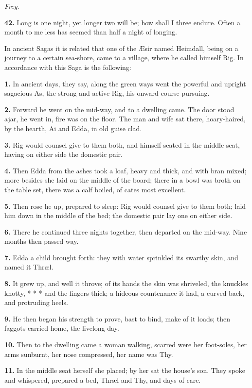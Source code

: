 \emph{Frey}.

\textbf{42.} Long is one night, yet longer two will be; how shall I three
endure. Often a month to me less has seemed than half a night of
longing.


In ancient Sagas it is related that one of the Æsir named Heimdall,
being on a journey to a certain sea-shore, came to a village, where he
called himself Rig. In accordance with this Saga is the following:

\textbf{1.} In ancient days, they say, along the green ways went the powerful
and upright sagacious As, the strong and active Rig, his onward course
pursuing.

\textbf{2.} Forward he went on the mid-way, and to a dwelling came. The door
stood ajar, he went in, fire was on the floor. The man and wife sat
there, hoary-haired, by the hearth, Ai and Edda, in old guise clad.

\textbf{3.} Rig would counsel give to them both, and himself seated in the
middle seat, having on either side the domestic pair.

\textbf{4.} Then Edda from the ashes took a loaf, heavy and thick, and with
bran mixed; more besides she laid on the middle of the board; there in
a bowl was broth on the table set, there was a calf boiled, of cates
most excellent.

\textbf{5.} Then rose he up, prepared to sleep: Rig would counsel give to
them both; laid him down in the middle of the bed; the domestic pair
lay one on either side.

\textbf{6.} There he continued three nights together, then departed on the
mid-way. Nine months then passed way.

\textbf{7.} Edda a child brought forth: they with water sprinkled its swarthy
skin, and named it Thræl.

\textbf{8.} It grew up, and well it throve; of its hands the skin was
shriveled, the knuckles knotty, * * * and the fingers thick; a hideous
countenance it had, a curved back, and protruding heels.

\textbf{9.} He then began his strength to prove, bast to bind, make of it
loads; then faggots carried home, the livelong day.

\textbf{10.} Then to the dwelling came a woman walking, scarred were her
foot-soles, her arms sunburnt, her nose compressed, her name was Thy.

\textbf{11.} In the middle seat herself she placed; by her sat the house's
son. They spoke and whispered, prepared a bed, Thræl and Thy, and days
of care.

